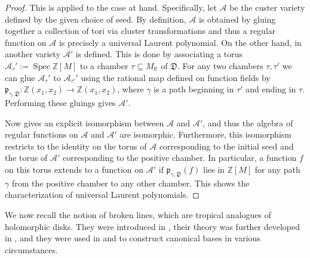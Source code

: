 \documentclass[11pt]{amsart}
\theoremstyle{remark}
\numberwithin{equation}{section}
\newcommand{\RR}{\mathbb{R}}
\newcommand{\ZZ}{\mathbb{Z}}
\newcommand{\cA}{\mathcal{A}}
\newcommand{\fD}{\mathfrak{D}}
\newcommand{\fp}{\mathfrak{p}}
\newcommand{\Spec}{\operatorname{Spec}}
\begin{document}
\begin{proof}
  This is \cite[Theorem 4.4]{GHKK} applied to the case at hand.
  Specifically, let $\cA$ be the custer variety defined by the given choice of
  seed. By definition, $\cA$ is obtained by gluing together a collection of tori
  via cluster transformations and thus a regular function on $\cA$ is precisely a
  universal Laurent polynomial.  On the other hand, in
  \cite[Section 4]{GHKK} another variety $\cA'$ is defined. This is done by
  associating a torus $\cA_{\tau}':= \Spec \ZZ[M]$ to a chamber $\tau\subseteq
  M_{\RR}$ of $\fD$. For any two chambers $\tau,\tau'$ we can glue $\cA_{\tau}'$
  to $\cA_{\tau'}'$ using the rational map defined on function fields by
  $\fp_{\gamma,\fD}:\ZZ(x_1,x_2)\rightarrow \ZZ(x_1,x_2)$, where $\gamma$
  is a path beginning in $\tau'$ and ending in $\tau$. Performing these gluings
  gives $\cA'$.

  Now \cite[Theorem 4.4]{GHKK} gives an explicit isomorphism between $\cA$ and
  $\cA'$, and thus the algebra of regular functions on $\cA$ and $\cA'$ are
  isomorphic. Furthermore, this isomorphism restricts to the identity on the
  torus of $\cA$ corresponding to the initial seed and the torus of $\cA'$
  corresponding to the positive chamber. In particular, a function $f$ on this
  torus extends to a function on $\cA'$ if $\fp_{\gamma,\fD}(f)$ lies in
  $\ZZ[M]$ for any path $\gamma$ from the positive chamber to any other
  chamber. This shows the characterization of universal Laurent polynomials.
\end{proof}

We now recall the notion of broken lines, which are tropical analogues of holomorphic disks.  They were introduced in \cite{G10}, their theory was further developed in \cite{CPS}, and they were
used in \cite{GHK11} and \cite{GHKK} to construct canonical bases in various
circumstances.
\end{document}

